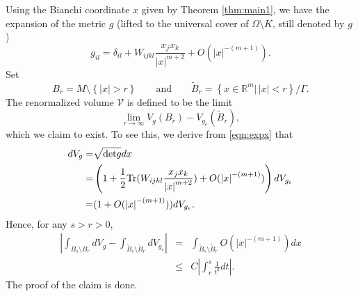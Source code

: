 \documentclass{amsart}
\newcommand{\abs}[1]{\left\vert#1\right\vert}
\newcommand{\set}[1]{\left\{#1\right\}}
\newcommand{\Real}{\mathbb R}
\numberwithin{equation}{section}
\begin{document}
Using the Bianchi coordinate $x$ given by Theorem \ref{thm:main1}, we have the expansion of the metric $g$ (lifted to the universal cover of $\Omega\setminus K$, still denoted by $g$)
\begin{equation}
	\label{eqn:expx}
	g_{il}=\delta_{il}+W_{ijkl}\frac{x_jx_k}{\abs{x}^{m+2}} +O(\abs{x}^{-(m+1)}).
\end{equation}
Set 
\[
	B_r=M \setminus \set{\abs{x}>r}	 \qquad \text{and} \qquad \tilde{B}_r= \set{x\in \Real^m|\, \abs{x}<r}/\Gamma.
\]
The renormalized volume $\mathcal V$ is defined to be the limit
\[
	\lim_{r\to \infty } V_g(B_r)-V_{g_e}(\tilde{B}_r),
\]
which we claim to exist.
To see this, we derive from \eqref{eqn:expx} that
\begin{equation}
	\label{eqn:final2}
	\begin{split}
		dV_g =& \sqrt{{\rm det} g} dx \\
		=& \left(1 + \frac{1}{2}{\rm Tr}(W_{ijkl}\frac{x_jx_k}{\abs{x}^{m+2}})+ O(\abs{x}^{-(m+1)})\right) dV_{g_e} \\
		=& (1+ O(\abs{x}^{-(m+1)}))dV_{g_e}.
	\end{split}
\end{equation}
Hence, for any $s>r>0$,
\begin{eqnarray*}
	\abs{\int_{B_s\setminus B_r} dV_g - \int_{\tilde{B}_s\setminus \tilde{B}_r} dV_{g_e}} &=& {\int_{\tilde{B}_s\setminus \tilde{B}_r} O(\abs{x}^{-(m+1)}) dx} \\
											      &\leq& C \abs{\int_r^s \frac{1}{t^2} dt}.
\end{eqnarray*}
The proof of the claim is done.
\end{document}
